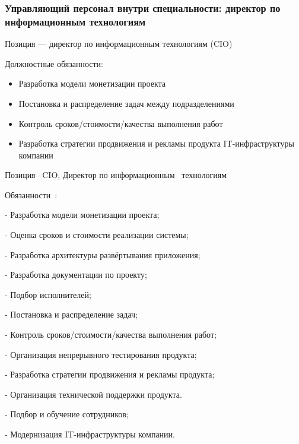 \documentclass{../industrial-development}
\begin{document}
\begin{frame} \frametitle{Управляющий персонал внутри специальности: директор по информационным технологиям }
 \begin{block}{}
  \alert{Позиция --- директор по информационным технологиям (CIO)}

Должностные обязанности: 
  \end{block}
  \begin{itemize}
  \item Разработка модели монетизации проекта
 \item Постановка и распределение задач между подразделениями
\item Контроль сроков/стоимости/качества выполнения работ
 \item Разработка стратегии продвижения и рекламы продукта
   IT-инфраструктуры компании
  \end{itemize}
\end{frame}

\lecturenotes

	Позиция –CIO, Директор по информационным~\cite{hh} технологиям~\cite{itcf}

Обязанности~\cite{rab}:

- Разработка модели монетизации проекта;

- Оценка сроков и стоимости реализации системы;

- Разработка архитектуры развёртывания приложения;

- Разработка документации по проекту;

- Подбор исполнителей;

- Постановка и распределение задач;

- Контроль сроков/стоимости/качества выполнения работ;

- Организация непрерывного тестирования продукта;

- Разработка стратегии продвижения и рекламы продукта;

- Организация технической поддержки продукта.

- Подбор и обучение сотрудников;

- Модернизация IT-инфраструктуры компании.
\end{document}
